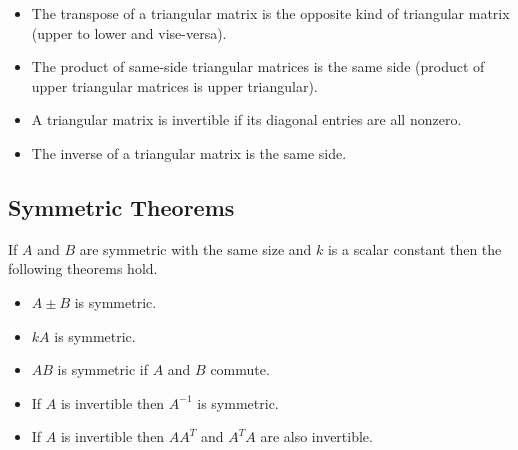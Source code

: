 \documentclass[12pt]{article}
\begin{document}
\begin{itemize}
    \item The transpose of a triangular matrix is the opposite kind of triangular matrix (upper to lower and vise-versa).
    \item The product of same-side triangular matrices is the same side (product of upper triangular matrices is upper triangular).
    \item A triangular matrix is invertible if its diagonal entries are all nonzero.
    \item The inverse of a triangular matrix is the same side.
\end{itemize}


\subsection{Symmetric Theorems}

If $A$ and $B$ are symmetric with the same size and $k$ is a scalar constant then the following theorems hold.
\begin{itemize}
    \item $A \pm B$ is symmetric.
    \item $kA$ is symmetric.
    \item $AB$ is symmetric if $A$ and $B$ commute.
    \item If $A$ is invertible then $A^{-1}$ is symmetric.
    \item If $A$ is invertible then $AA^T$ and $A^TA$ are also invertible.
\end{itemize}
\end{document}
